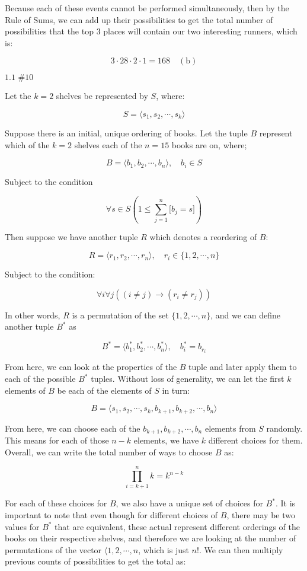 \documentclass{article}
\newcommand{\problem}[2]{$\boxed{\text{#1 \##2}}$}
\newcommand{\subsolution}[2]{\boxed{#2\quad(\text{#1})}}
\newcommand{\ROS}{Rule of Sums}
\begin{document}
\begin{multicols*}{2}
\hspace{2em} Because each of these events cannot be performed
simultaneously, then by the \ROS, we can add up their possibilities to
get the total number of possibilities that the top 3 places will
contain our two interesting runners, which is:

\[
\subsolution{b}{3\cdot28\cdot2\cdot1=168}
\]

%
\problem{1.1}{10}

Let the $k=2$ shelves be represented by $S$, where:

\[
S=\langle s_1,s_2,\cdots,s_k\rangle
\]

Suppose there is an initial, unique ordering of books. Let the tuple
$B$ represent which of the $k=2$ shelves each of the $n=15$ books are
on, where;

\[
B=\langle b_1,b_2,\cdots,b_n\rangle,\quad b_i\in S
\]

Subject to the condition

\[
\forall s\in S\left(1\le\sum\limits_{j=1}^n\lbrack b_j=s\rbrack\right)
\]

Then suppose we have another tuple $R$ which denotes a reordering of
$B$:

\[
R=\langle r_1,r_2,\cdots,r_n\rangle,\quad r_i\in\{1,2,\cdots,n\}
\]

Subject to the condition:

\[
\forall i\forall j((i\ne j)\rightarrow(r_i\ne r_j))
\]

In other words, $R$ is a permutation of the set $\{1,2,\cdots,n\}$,
and we can define another tuple $B^*$ as

\[
B^*=\langle b^*_1,b^*_2,\cdots,b^*_n\rangle,\quad b^*_i=b_{r_i}
\]

From here, we can look at the properties of the $B$ tuple and later
apply them to each of the possible $B^*$ tuples. Without loss of
generality, we can let the first $k$ elements of $B$ be each of the
elements of $S$ in turn:

\[
B=\langle s_1, s_2,\cdots,s_k,b_{k+1},b_{k+2},\cdots,b_n\rangle
\]

From here, we can choose each of the $b_{k+1},b_{k+2},\cdots,b_n$
elements from $S$ randomly. This means for each of those $n-k$
elements, we have $k$ different choices for them. Overall, we can
write the total number of ways to choose $B$ as:

\[
\prod\limits_{i=k+1}^n k=k^{n-k}
\]

For each of these choices for $B$, we also have a unique set of
choices for $B^*$. It is important to note that even though for
different choices of $B$, there may be two values for $B^*$ that are
equivalent, these actual represent different orderings of the books on
their respective shelves, and therefore we are looking at the number
of permutations of the vector $\langle1,2,\cdots,n$, which is just
$n!$. We can then multiply previous counts of possibilities to get the
total as:


\end{multicols*}
\end{document}
